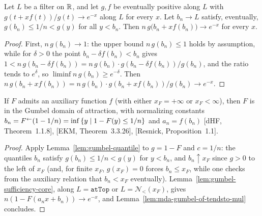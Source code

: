 \begin{lemma}
  \label{lem:gumbel-sufficiency-core}
  \leanok
  Let $L$ be a filter on $\mathbb{R}$, and let $g, f$ be eventually positive along $L$ with
  $g(t + x f(t))/g(t) \to e^{-x}$ along $L$ for every $x$. Let $b_n \to L$ satisfy, eventually,
  $g(b_n) \le 1/n < g(y)$ for all $y < b_n$. Then
  $n \, g\big( b_n + x f(b_n) \big) \to e^{-x}$ for every $x$.
\end{lemma}
\begin{proof}
  \leanok
  First, $n \, g(b_n) \to 1$: the upper bound $n \, g(b_n) \le 1$ holds by assumption, while for
  $\delta > 0$ the point $b_n - \delta f(b_n) < b_n$ gives
  $1 < n \, g(b_n - \delta f(b_n)) = n \, g(b_n) \cdot g(b_n - \delta f(b_n))/g(b_n)$, and the
  ratio tends to $e^{\delta}$, so $\liminf n \, g(b_n) \ge e^{-\delta}$. Then
  $n \, g(b_n + x f(b_n)) = n \, g(b_n) \cdot g(b_n + x f(b_n))/g(b_n) \to e^{-x}$.
\end{proof}

\begin{theorem}
  \label{thm:mda-gumbel-of-auxiliary}
  \leanok
  If $F$ admits an auxiliary function $f$ (with either $x_F = +\infty$ or $x_F < \infty$),
  then $F$ is in the Gumbel domain of attraction, with normalizing constants
  $b_n = F^{\leftarrow}(1 - 1/n) = \inf \left\{  y \; | \; 1 - F(y) \le 1/n  \right\}$ and $a_n = f(b_n)$
  [dHF, Theorem~1.1.8], [EKM, Theorem~3.3.26], [Resnick, Proposition~1.1].
\end{theorem}
\begin{proof}
  \leanok
  Apply Lemma~\ref{lem:gumbel-quantile} to $g = 1 - F$ and $c = 1/n$: the quantiles $b_n$
  satisfy $g(b_n) \le 1/n < g(y)$ for $y < b_n$, and $b_n \uparrow x_F$ since $g > 0$ to the left
  of $x_F$ (and, for finite $x_F$, $g(x_F) = 0$ forces $b_n \le x_F$, while one checks from the
  auxiliary relation that $b_n < x_F$ eventually). Lemma~\ref{lem:gumbel-sufficiency-core}, along
  $L = \texttt{atTop}$ or $L = \mathcal{N}_{<}(x_F)$, gives
  $n (1 - F(a_n x + b_n)) \to e^{-x}$, and Lemma~\ref{lem:mda-gumbel-of-tendsto-mul} concludes.
\end{proof}

